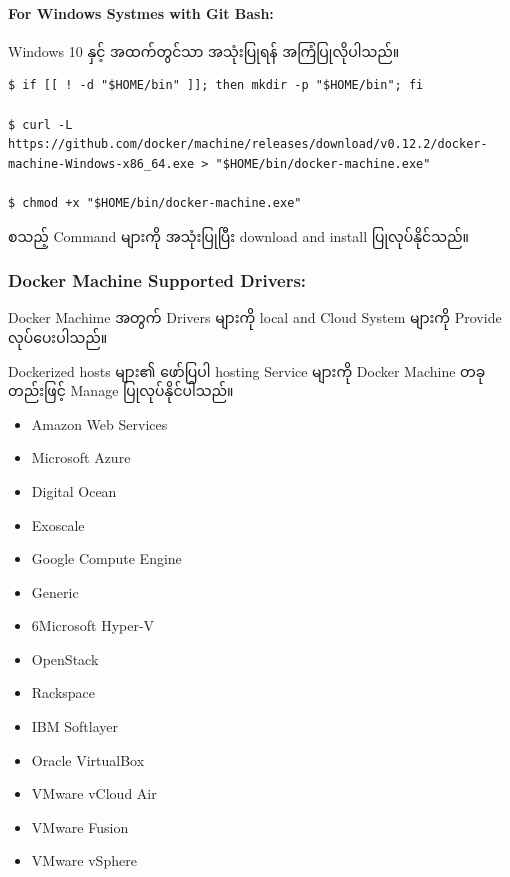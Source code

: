 \documentclass{article}
\begin{document}
\paragraph{For Windows Systmes with Git
Bash:}\label{for-windows-systmes-with-git-bash}

Windows 10 နှင့် အထက်တွင်သာ အသုံးပြုရန် အကြံပြုလိုပါသည်။

\begin{verbatim}
$ if [[ ! -d "$HOME/bin" ]]; then mkdir -p "$HOME/bin"; fi

$ curl -L https://github.com/docker/machine/releases/download/v0.12.2/docker-machine-Windows-x86_64.exe > "$HOME/bin/docker-machine.exe"

$ chmod +x "$HOME/bin/docker-machine.exe"
\end{verbatim}

စသည့် Command များကို အသုံးပြုပြီး download and install ပြုလုပ်နိုင်သည်။

\subsubsection{Docker Machine Supported
Drivers:}\label{docker-machine-supported-drivers}

Docker Machime အတွက် Drivers များကို local and Cloud System များကို
Provide လုပ်ပေးပါသည်။

Dockerized hosts များ၏ ဖော်ပြပါ hosting Service များကို Docker Machine
တခုတည်းဖြင့် Manage ပြုလုပ်နိုင်ပါသည်။

\begin{itemize}
\itemsep1pt\parskip0pt
\item
  Amazon Web Services\\
\item
  Microsoft Azure\\
\item
  Digital Ocean\\
\item
  Exoscale\\
\item
  Google Compute Engine\\
\item
  Generic\\
\item
  6Microsoft Hyper-V\\
\item
  OpenStack\\
\item
  Rackspace\\
\item
  IBM Softlayer\\
\item
  Oracle VirtualBox\\
\item
  VMware vCloud Air\\
\item
  VMware Fusion\\
\item
  VMware vSphere
\end{itemize}
\end{document}
